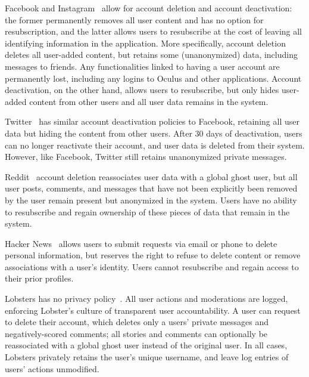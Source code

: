
Facebook and Instagram~\cite{facebook:privacy} allow for account deletion and account deactivation:
the former permanently removes all user content and has no option for resubscription, and the latter
allows users to resubscribe at the cost of leaving all identifying information in the application.
More specifically, account deletion deletes all user-added content, but retains some (unanonymized)
data, including messages to friends. Any functionalities linked to having a user account are permanently lost,
including any logins to Oculus and other applications. Account deactivation, on the other hand,
allows users to resubscribe, but only hides user-added content from other users and all user data
remains in the system. 

Twitter~\cite{twitter:privacy} has similar account deactivation policies to Facebook, retaining all
user data but hiding the content from other users. After 30 days of deactivation, users can no
longer reactivate their account, and user data is deleted from their system.  However, like
Facebook, Twitter still retains unanonymized private messages.

Reddit~\cite{reddit:privacy} account deletion reassociates user data with a global ghost user, but
all user posts, comments, and messages that have not been explicitly been removed by the user remain
present but anonymized in the system. Users have no ability to resubscribe and regain
ownership of these pieces of data that remain in the system. 

Hacker News~\cite{hackernews:privacy} allows users to submit requests via email or phone to delete
personal information, but reserves the right to refuse to delete content or remove associations with
a user's identity.  Users cannot resubscribe and regain access to their prior profiles.

Lobsters has no privacy policy~\cite{lobsters:privacy}. All user actions and moderations are
logged, enforcing Lobster's culture of transparent user accountability. A user can request to delete
their account, which deletes only a users' private messages and negatively-scored comments; all
stories and comments can optionally be reassociated with a global ghost user instead of the original
user. In all cases, Lobsters privately retains the user's unique username, and leave log entries of users'
actions unmodified.

